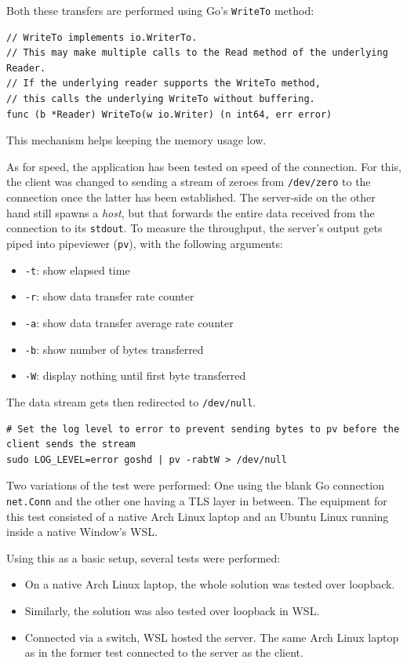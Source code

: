 \documentclass[10pt,a4paper,titlepage,twoside,english,final]{zhawreprt}
\begin{document}
Both these transfers are performed using \gls{Go}'s \texttt{WriteTo} method:
\setlistingGo
\begin{lstlisting}[caption={\texttt{WriteTo} method of \gls{Go}},label=lst:GoWriteTo]
// WriteTo implements io.WriterTo.
// This may make multiple calls to the Read method of the underlying Reader.
// If the underlying reader supports the WriteTo method,
// this calls the underlying WriteTo without buffering.
func (b *Reader) WriteTo(w io.Writer) (n int64, err error)
\end{lstlisting}

This mechanism helps keeping the memory usage low.

As for speed, the application has been tested on speed of the connection.
For this, the client was changed to sending a stream of zeroes from \texttt{/dev/zero} to the connection once the latter has been established.
The server-side on the other hand still spawns a \textit{host}, but that forwards the entire data received from the connection to its \texttt{stdout}.
To measure the throughput, the server's output gets piped into pipeviewer (\texttt{pv}), with the following arguments:
\begin{itemize}
\item \texttt{-t}: show elapsed time
\item \texttt{-r}: show data transfer rate counter
\item \texttt{-a}: show data transfer average rate counter
\item \texttt{-b}: show number of bytes transferred
\item \texttt{-W}: display nothing until first byte transferred
\end{itemize}
The data stream gets then redirected to \texttt{/dev/null}.

\setlistingBash
\begin{lstlisting}[caption={Throughput measurement},label=lst:ThroughputMeasurement]
# Set the log level to error to prevent sending bytes to pv before the client sends the stream
sudo LOG_LEVEL=error goshd | pv -rabtW > /dev/null
\end{lstlisting}

Two variations of the test were performed:
One using the blank \gls{Go} connection \texttt{net.Conn} and the other one having a \gls{TLS} layer in between.
The equipment for this test consisted of a native Arch \gls{Linux} laptop and an Ubuntu \gls{Linux} running inside a native Window's \gls{WSL}.

Using this as a basic setup, several tests were performed:
\begin{itemize}
\item On a native Arch \gls{Linux} laptop, the whole solution was tested over \gls{loopback}.
\item Similarly, the solution was also tested over \gls{loopback} in \gls{WSL}.
\item Connected via a switch, \gls{WSL} hosted the server.
The same Arch \gls{Linux} laptop as in the former test connected to the server as the client.
\end{itemize}
\end{document}
